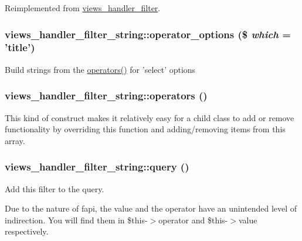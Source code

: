 Reimplemented from \hyperlink{classviews__handler__filter_a655263cd0b73188eec064b9a9743fe4c}{views\_\-handler\_\-filter}.\hypertarget{classviews__handler__filter__string_a9b6d71fc1698780860f2ec9ff84f2b46}{
\subsubsection[{operator\_\-options}]{\setlength{\rightskip}{0pt plus 5cm}views\_\-handler\_\-filter\_\-string::operator\_\-options (\$ {\em which} = {\ttfamily 'title'})}}
\label{classviews__handler__filter__string_a9b6d71fc1698780860f2ec9ff84f2b46}
Build strings from the \hyperlink{classviews__handler__filter__string_adb301581372054e2f66faab09e47004e}{operators()} for 'select' options \hypertarget{classviews__handler__filter__string_adb301581372054e2f66faab09e47004e}{
\subsubsection[{operators}]{\setlength{\rightskip}{0pt plus 5cm}views\_\-handler\_\-filter\_\-string::operators ()}}
\label{classviews__handler__filter__string_adb301581372054e2f66faab09e47004e}
This kind of construct makes it relatively easy for a child class to add or remove functionality by overriding this function and adding/removing items from this array. \hypertarget{classviews__handler__filter__string_afcfdae379583a2eb912e1b82d4513503}{
\subsubsection[{query}]{\setlength{\rightskip}{0pt plus 5cm}views\_\-handler\_\-filter\_\-string::query ()}}
\label{classviews__handler__filter__string_afcfdae379583a2eb912e1b82d4513503}
Add this filter to the query.

Due to the nature of fapi, the value and the operator have an unintended level of indirection. You will find them in \$this-\/$>$operator and \$this-\/$>$value respectively. 

